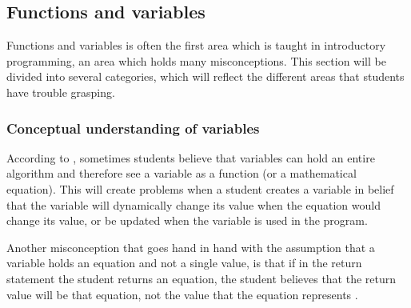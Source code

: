 \mode*
\subsection{Functions and variables}

Functions and variables is often the first area which is taught in 
introductory programming, an area which holds many misconceptions. This 
section will be divided into several categories, which will reflect the 
different areas that students have trouble grasping.  

\subsubsection{Conceptual understanding of variables}

According to \textcite{%
  Kohn2017VariableEvaluation,%
  Plass2015Variables,%
  Doukakis2007%
}, sometimes students believe that variables can hold an entire algorithm and 
therefore see a variable as a function (or a mathematical equation).
This will create problems when a student creates a variable in belief that the 
variable will dynamically change its value when the equation would change its 
value, or be updated when the variable is used in the program.


Another misconception that goes hand in hand with the assumption that a 
variable holds an equation and not a single value, is that if in the return 
statement the student returns an equation, the student believes that the return 
value will be that equation, not the value that the equation represents 
\autocite{Kohn2017VariableEvaluation}.


